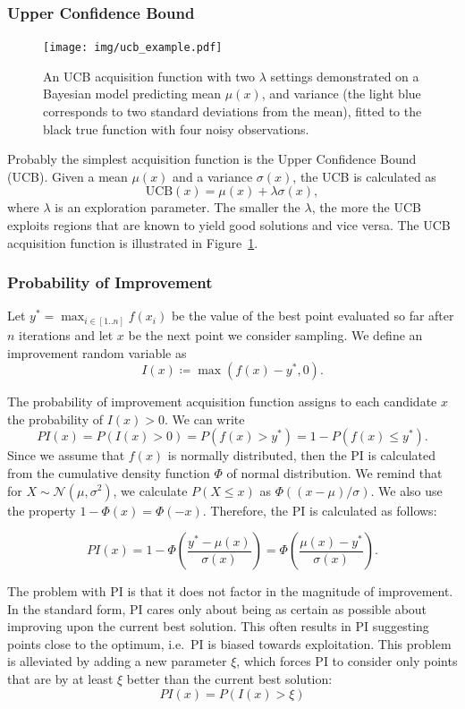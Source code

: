 \subsubsection{Upper Confidence Bound}

\begin{figure}
    \centering
    \texttt{[image: img/ucb\_example.pdf]}
    \caption{An UCB acquisition function with two $\lambda$ settings demonstrated on a Bayesian model predicting mean $\mu(x)$, and variance (the light blue corresponds to two standard deviations from the mean), fitted to the black true function with four noisy observations.}
    \label{fig:ucb}
\end{figure}

Probably the simplest acquisition function is the Upper Confidence Bound (UCB). Given a mean $\mu(x)$ and a variance $\sigma(x)$, the UCB is calculated as
\[
    \text{UCB}(x) = \mu(x) + \lambda \sigma(x),
\]
where $\lambda$ is an exploration parameter. The smaller the $\lambda$, the more the UCB exploits regions that are known to yield good solutions and vice versa. The UCB acquisition function is illustrated in Figure~\ref{fig:ucb}.

\subsubsection{Probability of Improvement}
Let $y^*=\max_{i\in[1..n]} f(x_i)$ be the value of the best point evaluated so far after $n$ iterations and let $x$ be the next point we consider sampling. We define an improvement random variable as
\[
    I(x) \coloneq \max(f(x) - y^*,0).
\]

The probability of improvement acquisition function assigns to each candidate $x$ the probability of $I(x) > 0$. We can write
\[
    PI(x) = P(I(x) > 0) = P(f(x) > y^*) = 1-P(f(x) \leq y^*).
\]
Since we assume that $f(x)$ is normally distributed, then the PI is calculated from the cumulative density function $\Phi$ of normal distribution. We remind that for $X \sim \mathcal{N}(\mu,\sigma^2)$, we calculate $P(X \leq x)$ as $\Phi ((x-\mu)/\sigma )$. We also use the property $1-\Phi(x)=\Phi(-x)$. Therefore, the PI is calculated as follows:

\[
    PI(x) = 1 - \Phi\left(\frac{y^*-\mu(x)}{\sigma(x)}\right) = \Phi\left(\frac{\mu(x)-y^*}{\sigma(x)}\right).
\]

The problem with PI is that it does not factor in the magnitude of improvement. In the standard form, PI cares only about being as certain as possible about improving upon the current best solution. This often results in PI suggesting points close to the optimum, i.e.\ PI is biased towards exploitation. This problem is alleviated by adding a new parameter $\xi$, which forces PI to consider only points that are by at least $\xi$ better than the current best solution:
\[
    PI(x)=P(I(x)>\xi)
\]

